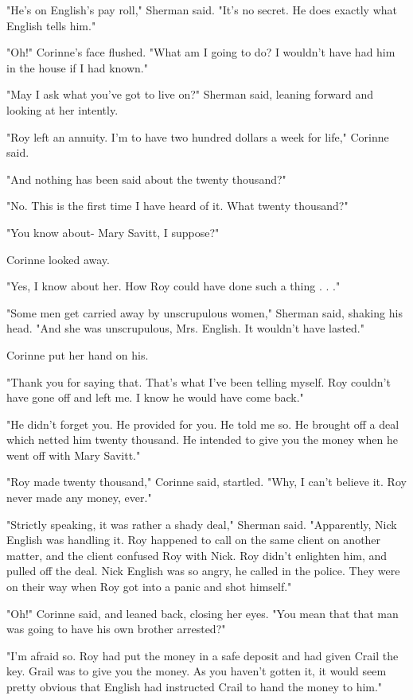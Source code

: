 \documentclass{novel}
\begin{document}
"He's on English's pay roll," Sherman said. "It's no secret. He does exactly what English tells him."

"Oh!" Corinne's face flushed. "What am I going to do? I wouldn't have had him in the house if I had known."

"May I ask what you've got to live on?" Sherman said, leaning forward and looking at her intently.

"Roy left an annuity. I'm to have two hundred dollars a week for life," Corinne said.

"And nothing has been said about the twenty thousand?"

"No. This is the first time I have heard of it. What twenty thousand?"

"You know about- Mary Savitt, I suppose?"

Corinne looked away.

"Yes, I know about her. How Roy could have done such a thing . . ."

"Some men get carried away by unscrupulous women," Sherman said, shaking his head. "And she was unscrupulous, Mrs. English. It wouldn't have lasted."

Corinne put her hand on his.

"Thank you for saying that. That's what I've been telling myself. Roy couldn't have gone off and left me. I know he would have come back."

"He didn't forget you. He provided for you. He told me so. He brought off a deal which netted him twenty thousand. He intended to give you the money when he went off with Mary Savitt."

"Roy made twenty thousand," Corinne said, startled. "Why, I can't believe it. Roy never made any money, ever."

"Strictly speaking, it was rather a shady deal," Sherman said. "Apparently, Nick English was handling it. Roy happened to call on the same client on another matter, and the client confused Roy with Nick. Roy didn't enlighten him, and pulled off the deal. Nick English was so angry, he called in the police. They were on their way when Roy got into a panic and shot himself."

"Oh!" Corinne said, and leaned back, closing her eyes. "You mean that that man was going to have his own brother arrested?"

"I'm afraid so. Roy had put the money in a safe deposit and had given Crail the key. Grail was to give you the money. As you haven't gotten it, it would seem pretty obvious that English had instructed Crail to hand the money to him."
\end{document}
